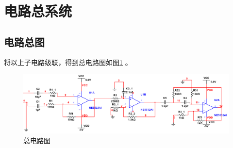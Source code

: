 \documentclass[12pt]{article}
\begin{document}
\section{电路总系统}
\setcounter{equation}{0}
\setcounter{table}{0}
\setcounter{figure}{0}
\subsection{电路总图}
将以上子电路级联，得到总电路图如图\ref{all}
。
\begin{figure}[htbp]
  \centering
  \includegraphics[width=\textwidth]{picture/TIM20190505135556}
  \caption{总电路图}\label{all}
\end{figure}
\end{document}
